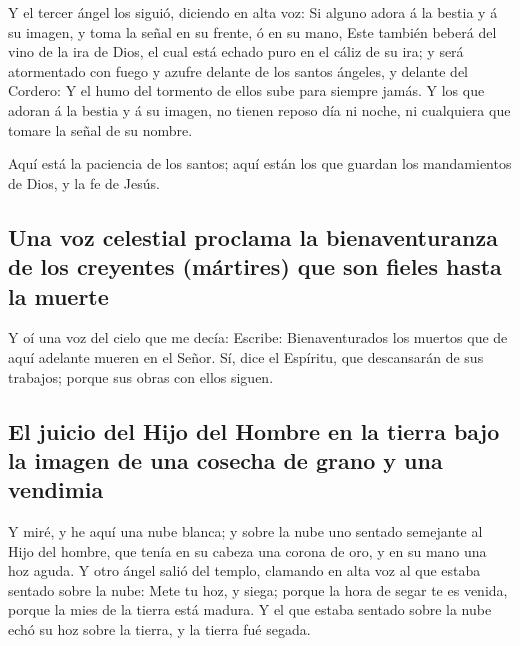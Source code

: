  Y el tercer ángel los siguió, diciendo en alta voz: Si
alguno adora á la bestia y á su imagen, y toma la señal en su frente, ó
en su mano,  Este también beberá del vino de la ira de
Dios, el cual está echado puro en el cáliz de su ira; y será atormentado
con fuego y azufre delante de los santos ángeles, y delante del Cordero:
 Y el humo del tormento de ellos sube para siempre jamás. Y
los que adoran á la bestia y á su imagen, no tienen reposo día ni noche,
ni cualquiera que tomare la señal de su nombre.

 Aquí está la paciencia de los santos; aquí están los que
guardan los mandamientos de Dios, y la fe de Jesús.

\hypertarget{una-voz-celestial-proclama-la-bienaventuranza-de-los-creyentes-muxe1rtires-que-son-fieles-hasta-la-muerte}{%
\subsection{Una voz celestial proclama la bienaventuranza de los
creyentes (mártires) que son fieles hasta la
muerte}\label{una-voz-celestial-proclama-la-bienaventuranza-de-los-creyentes-muxe1rtires-que-son-fieles-hasta-la-muerte}}

 Y oí una voz del cielo que me decía: Escribe:
Bienaventurados los muertos que de aquí adelante mueren en el Señor. Sí,
dice el Espíritu, que descansarán de sus trabajos; porque sus obras con
ellos siguen.

\hypertarget{el-juicio-del-hijo-del-hombre-en-la-tierra-bajo-la-imagen-de-una-cosecha-de-grano-y-una-vendimia}{%
\subsection{El juicio del Hijo del Hombre en la tierra bajo la imagen de
una cosecha de grano y una
vendimia}\label{el-juicio-del-hijo-del-hombre-en-la-tierra-bajo-la-imagen-de-una-cosecha-de-grano-y-una-vendimia}}

 Y miré, y he aquí una nube blanca; y sobre la nube uno
sentado semejante al Hijo del hombre, que tenía en su cabeza una corona
de oro, y en su mano una hoz aguda.  Y otro ángel salió del
templo, clamando en alta voz al que estaba sentado sobre la nube: Mete
tu hoz, y siega; porque la hora de segar te es venida, porque la mies de
la tierra está madura.  Y el que estaba sentado sobre la
nube echó su hoz sobre la tierra, y la tierra fué segada.

